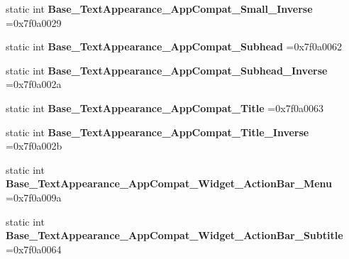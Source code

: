 \begin{DoxyCompactItemize}
static int {\bfseries Base\+\_\+\+Text\+Appearance\+\_\+\+App\+Compat\+\_\+\+Small\+\_\+\+Inverse} =0x7f0a0029
\item 
\mbox{\label{classandroid_1_1support_1_1graphics_1_1drawable_1_1R_1_1style_ad2394f91c09412828e90ea68a503d54e}} 
static int {\bfseries Base\+\_\+\+Text\+Appearance\+\_\+\+App\+Compat\+\_\+\+Subhead} =0x7f0a0062
\item 
\mbox{\label{classandroid_1_1support_1_1graphics_1_1drawable_1_1R_1_1style_aecadb313312ee959f4e11e69eda2bfc2}} 
static int {\bfseries Base\+\_\+\+Text\+Appearance\+\_\+\+App\+Compat\+\_\+\+Subhead\+\_\+\+Inverse} =0x7f0a002a
\item 
\mbox{\label{classandroid_1_1support_1_1graphics_1_1drawable_1_1R_1_1style_a9260fd9dad80c50a87180f0a773fb28c}} 
static int {\bfseries Base\+\_\+\+Text\+Appearance\+\_\+\+App\+Compat\+\_\+\+Title} =0x7f0a0063
\item 
\mbox{\label{classandroid_1_1support_1_1graphics_1_1drawable_1_1R_1_1style_aee00d110aed4696b58368d12b7d56370}} 
static int {\bfseries Base\+\_\+\+Text\+Appearance\+\_\+\+App\+Compat\+\_\+\+Title\+\_\+\+Inverse} =0x7f0a002b
\item 
\mbox{\label{classandroid_1_1support_1_1graphics_1_1drawable_1_1R_1_1style_a5535875c6bf00b355298c435f1cbc6af}} 
static int {\bfseries Base\+\_\+\+Text\+Appearance\+\_\+\+App\+Compat\+\_\+\+Widget\+\_\+\+Action\+Bar\+\_\+\+Menu} =0x7f0a009a
\item 
\mbox{\label{classandroid_1_1support_1_1graphics_1_1drawable_1_1R_1_1style_aee277224009bdc3bc963ee092583e19d}} 
static int {\bfseries Base\+\_\+\+Text\+Appearance\+\_\+\+App\+Compat\+\_\+\+Widget\+\_\+\+Action\+Bar\+\_\+\+Subtitle} =0x7f0a0064
\item 
\mbox{\label{classandroid_1_1support_1_1graphics_1_1drawable_1_1R_1_1style_a8cc65ab2cfaf0f44dcff4f13fc0d9b9f}} 

\end{DoxyCompactItemize}
